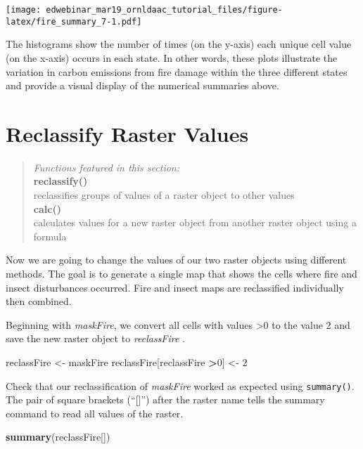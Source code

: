 \documentclass[
]{article}
\newenvironment{Shaded}{\begin{snugshade}}{\end{snugshade}}
\newcommand{\DecValTok}[1]{\textcolor[rgb]{0.00,0.00,0.81}{#1}}
\newcommand{\FunctionTok}[1]{\textcolor[rgb]{0.13,0.29,0.53}{\textbf{#1}}}
\newcommand{\NormalTok}[1]{#1}
\newcommand{\OtherTok}[1]{\textcolor[rgb]{0.56,0.35,0.01}{#1}}
\newcommand{\SpecialCharTok}[1]{\textcolor[rgb]{0.81,0.36,0.00}{\textbf{#1}}}
\begin{document}
\texttt{[image: edwebinar\_mar19\_ornldaac\_tutorial\_files/figure-latex/fire\_summary\_7-1.pdf]}

The histograms show the number of times (on the y-axis) each unique cell
value (on the x-axis) occurs in each state. In other words, these plots
illustrate the variation in carbon emissions from fire damage within the
three different states and provide a visual display of the numerical
summaries above.

\hypertarget{reclassify-raster-values}{%
\section{Reclassify Raster Values}\label{reclassify-raster-values}}

\begin{quote}
\emph{Functions featured in this section:}\\
\textbf{reclassify()}\\
reclassifies groups of values of a raster object to other values\\
\textbf{calc()}\\
calculates values for a new raster object from another raster object
using a formula
\end{quote}

Now we are going to change the values of our two raster objects using
different methods. The goal is to generate a single map that shows the
cells where fire and insect disturbances occurred. Fire and insect maps
are reclassified individually then combined.

Beginning with \emph{maskFire}, we convert all cells with values
\textgreater0 to the value 2 and save the new raster object to
\emph{reclassFire} .

\begin{Shaded}
\begin{Highlighting}[]
\NormalTok{reclassFire }\OtherTok{\textless{}{-}}\NormalTok{ maskFire}
\NormalTok{reclassFire[reclassFire }\SpecialCharTok{\textgreater{}}\DecValTok{0}\NormalTok{] }\OtherTok{\textless{}{-}} \DecValTok{2}
\end{Highlighting}
\end{Shaded}

Check that our reclassification of \emph{maskFire} worked as expected
using \texttt{summary()}. The pair of square brackets (``{[}{]}'') after
the raster name tells the summary command to read all values of the
raster.

\begin{Shaded}
\begin{Highlighting}[]
\FunctionTok{summary}\NormalTok{(reclassFire[]) }
\end{Highlighting}
\end{Shaded}
\end{document}
